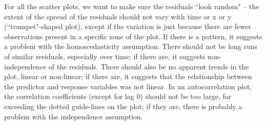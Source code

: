 \documentclass[twoside]{book}\usepackage[]{graphicx}\usepackage[]{xcolor}
\begin{document}
For all the scatter plots, we want to make sure the residuals ``look random" -- the extent of the spread of the residuals should not vary with time or x or y (``trumpet"-shaped plot), except if the variation is just because there are fewer observations present in a specific zone of the plot.  If there is a pattern, it suggests a problem with the homoscedasticity assumption.  There should not be long runs of similar residuals, especially over time; if there are, it suggests non-independence of the residuals.  There should also be no apparent trends in the plot, linear or non-linear; if there are, it suggests that the relationship between the predictor and response variables was not linear.  In an autocorrelation plot, the correlation coefficients (except for lag 0) should not be too large, far exceeding the dotted guide-lines on the plot; if they are, there is probably a problem with the independence assumption.
\end{document}
